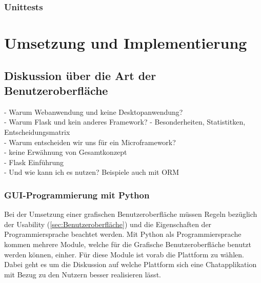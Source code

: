 \documentclass[a4paper,titlepage,halfparskip,12pt]{scrreprt}
\begin{document}
\begin{onehalfspacing}
\subsection{Unittests}
\label{Unittests}

\chapter{Umsetzung und Implementierung}
\label{chap:Umsetzung}

\section{Diskussion über die Art der Benutzeroberfläche}
\label{sec:DiskussionGUI}

- Warum Webanwendung und keine Desktopanwendung?\\
- Warum Flask und kein anderes Framework? - Besonderheiten, Statistitken, Entscheidungsmatrix\\
- Warum entscheiden wir uns für ein Microframework?\\
- keine Erwähnung von Gesamtkonzept\\
- Flask Einführung\\
- Und wie kann ich es nutzen? Beispiele auch mit ORM\\

\pagebreak
\subsection{GUI-Programmierung mit Python}
\label{subsec:GuiPython}
Bei der Umsetzung einer grafischen Benutzeroberfläche müssen Regeln bezüglich der Usability (\autoref{sec:Benutzeroberfläche}) und die Eigenschaften der Programmiersprache beachtet werden. Mit Python als Programmiersprache kommen mehrere Module, welche für die Grafische Benutzeroberfläche benutzt werden können, einher. Für diese Module ist vorab die Plattform zu wählen. Dabei geht es um die Diskussion auf welche Plattform sich eine Chatapplikation mit Bezug zu den Nutzern besser realisieren lässt.


\end{onehalfspacing}
\end{document}
